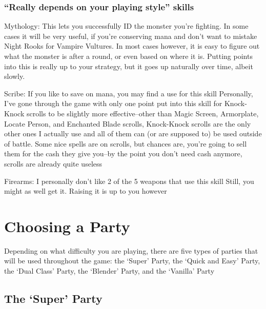 \documentclass[12pt]{article}
\begin{document}
\subsubsection{\texorpdfstring{``Really depends on your playing style''
skills}{Really depends on your playing style skills}}\label{really-depends-on-your-playing-style-skills}

Mythology: This lets you successfully ID the monster you're fighting. In
some cases it will be very useful, if you're conserving mana and don't
want to mistake Night Rooks for Vampire Vultures. In most cases however,
it is easy to figure out what the monster is after a round, or even
based on where it is. Putting points into this is really up to your
strategy, but it goes up naturally over time, albeit slowly.

Scribe: If you like to save on mana, you may find a use for this skill
Personally, I've gone through the game with only one point put into this
skill for Knock-Knock scrolls to be slightly more effective--other than
Magic Screen, Armorplate, Locate Person, and Enchanted Blade scrolls,
Knock-Knock scrolls are the only other ones I actually use and all of
them can (or are supposed to) be used outside of battle. Some nice
spells are on scrolls, but chances are, you're going to sell them for
the cash they give you--by the point you don't need cash anymore,
scrolls are already quite useless

Firearms: I personally don't like 2 of the 5 weapons that use this skill
Still, you might as well get it. Raising it is up to you however

\section{Choosing a Party}\label{choosing-a-party}

Depending on what difficulty you are playing, there are five types of
parties that will be used throughout the game: the `Super' Party, the
`Quick and Easy' Party, the `Dual Class' Party, the `Blender' Party, and
the `Vanilla' Party

\subsection{\texorpdfstring{The `Super'
Party}{The Super Party}}\label{the-super-party}
\end{document}
